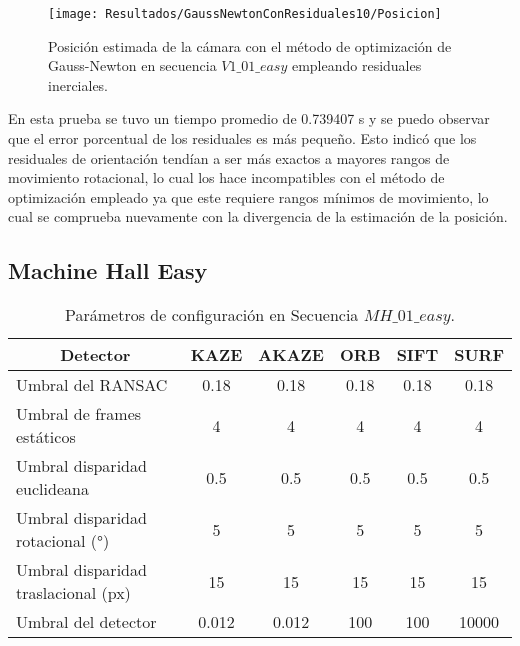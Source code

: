 \begin{figure}[H]
	\centering
	\texttt{[image: Resultados/GaussNewtonConResiduales10/Posicion]}
	\caption{Posición estimada de la cámara con el método de optimización de Gauss-Newton en secuencia $V1\_ 01\_ easy$ empleando residuales inerciales. }
	\label{imagen:Resultados/GaussNewtonConResiduales10/Posicion}
\end{figure}

En esta prueba se tuvo un tiempo promedio de 0.739407 s y se puedo observar que el error porcentual de los residuales es más pequeño. Esto indicó que los residuales de orientación tendían a ser más exactos a mayores rangos de movimiento rotacional, lo cual los hace incompatibles con el método de optimización empleado ya que este requiere rangos mínimos de movimiento, lo cual se comprueba nuevamente con la divergencia de la estimación de la posición.

\subsection{Machine Hall Easy}

\begin{table}[htbp]
	\caption{Parámetros de configuración en Secuencia $MH\_ 01\_ easy$.}
	\begin{tabular}{|l|c|c|c|c|c|}
		\hline
		\multicolumn{1}{|c|}{\textbf{Detector}} & \textbf{KAZE} & \textbf{AKAZE} & \textbf{ORB} & \textbf{SIFT} & \textbf{SURF} \\ \hline
		Umbral del RANSAC & 0.18 & 0.18 & 0.18 & 0.18 & 0.18 \\ \hline
		Umbral de frames estáticos & 4 & 4 & 4 & 4 & 4 \\ \hline
		Umbral disparidad euclideana & 0.5 & 0.5 & 0.5 & 0.5 & 0.5 \\ \hline
		Umbral disparidad rotacional (°) & 5 & 5 & 5 & 5 & 5 \\ \hline
		Umbral disparidad traslacional (px) & 15 & 15 & 15 & 15 & 15 \\ \hline
		Umbral del detector & 0.012 & 0.012 & 100 & 100 & 10000 \\ \hline
	\end{tabular}
	\label{Tabla/Parametros/MH_01_easy}
\end{table}







